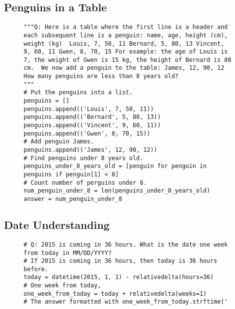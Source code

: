 \documentclass[dvipsnames]{article} \usepackage[accepted]{icml2022}
\begin{document}
\newpage
\subsection{Penguins in a Table}
\label{app:sec:penguins}
\begin{figure*}[!h]
\centering
\begin{subfigure}[t]{.95\textwidth}
\begin{verbatim}
"""Q: Here is a table where the first line is a header and each subsequent line is a penguin: name, age, height (cm), weight (kg)  Louis, 7, 50, 11 Bernard, 5, 80, 13 Vincent, 9, 60, 11 Gwen, 8, 70, 15 For example: the age of Louis is 7, the weight of Gwen is 15 kg, the height of Bernard is 80 cm.  We now add a penguin to the table: James, 12, 90, 12
How many penguins are less than 8 years old?
"""
# Put the penguins into a list.
penguins = []
penguins.append(('Louis', 7, 50, 11))
penguins.append(('Bernard', 5, 80, 13))
penguins.append(('Vincent', 9, 60, 11))
penguins.append(('Gwen', 8, 70, 15))
# Add penguin James.
penguins.append(('James', 12, 90, 12))
# Find penguins under 8 years old.
penguins_under_8_years_old = [penguin for penguin in penguins if penguin[1] < 8]
# Count number of perguins under 8.
num_penguin_under_8 = len(penguins_under_8_years_old)
answer = num_penguin_under_8
\end{verbatim}
\end{subfigure}
\caption{}
\label{fig:penguins}
\end{figure*}
 
 
 \newpage
\subsection{Date Understanding}
\begin{figure*}[!ht]
\centering
\begin{subfigure}[t]{.95\textwidth}

 \begin{verbatim}
# Q: 2015 is coming in 36 hours. What is the date one week from today in MM/DD/YYYY?
# If 2015 is coming in 36 hours, then today is 36 hours before.
today = datetime(2015, 1, 1) - relativedelta(hours=36)
# One week from today,
one_week_from_today = today + relativedelta(weeks=1)
# The answer formatted with one_week_from_today.strftime('\end{verbatim}
\label{fig:date:prompt}
\end{subfigure}
\end{figure*}
\end{document}
